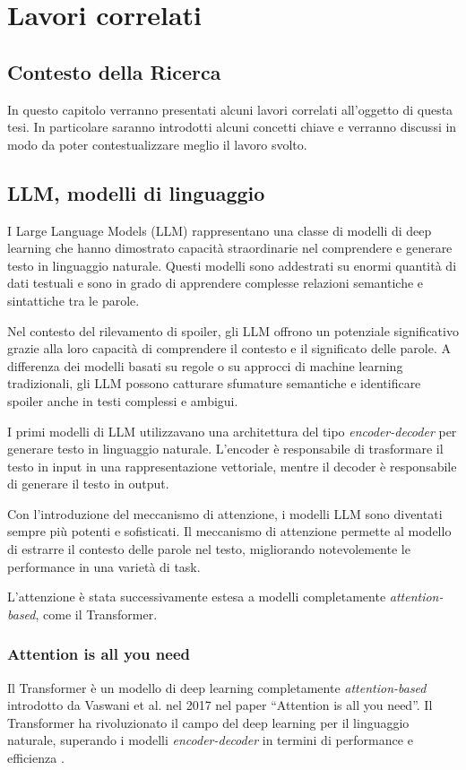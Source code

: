\chapter{Lavori correlati}
\label{ch:lavori-correlati}

\section{Contesto della Ricerca}
\label{sec:contesto-della-ricerca}
In questo capitolo verranno presentati alcuni lavori
correlati all'oggetto di questa tesi.
In particolare saranno introdotti alcuni concetti chiave e
verranno discussi in modo da poter contestualizzare meglio
il lavoro svolto.

\section{LLM, modelli di linguaggio}
\label{sec:llm-modelli-di-linguaggio}
I Large Language Models (LLM) rappresentano una classe di
modelli di deep learning che hanno dimostrato capacità
straordinarie nel comprendere e generare testo in
linguaggio naturale.
Questi modelli sono addestrati su enormi quantità di dati
testuali e sono in grado di apprendere complesse relazioni
semantiche e sintattiche tra le parole.

Nel contesto del rilevamento di spoiler, gli LLM offrono un
potenziale significativo grazie alla loro capacità di
comprendere il contesto e il significato delle parole.
A differenza dei modelli basati su regole o su approcci di
machine learning tradizionali, gli LLM possono catturare
sfumature semantiche e identificare spoiler anche in testi
complessi e ambigui.

I primi modelli di LLM utilizzavano una architettura del
tipo \textit{encoder-decoder} per generare testo in
linguaggio naturale.
L'encoder è responsabile di trasformare il testo in input
in una rappresentazione vettoriale, mentre il decoder è
responsabile di generare il testo in output.

Con l'introduzione del meccanismo di attenzione, i modelli
LLM sono diventati sempre più potenti e sofisticati.
Il meccanismo di attenzione permette al modello di estrarre
il contesto delle parole nel testo, migliorando
notevolemente le performance in una varietà di task.

L'attenzione è stata successivamente estesa a modelli
completamente \textit{attention-based}, come il
Transformer.

\subsection{Attention is all you need}
\label{sec:attention-is-all-you-need}
Il Transformer è un modello di deep learning completamente
\textit{attention-based} introdotto da Vaswani et al.
nel 2017 \cite{vaswani2017attention} nel paper ``Attention is
all you need''.
Il Transformer ha rivoluzionato il campo del deep learning
per il linguaggio naturale, superando i modelli
\textit{encoder-decoder} in termini di performance e
efficienza \cite{google2017transformer}.

